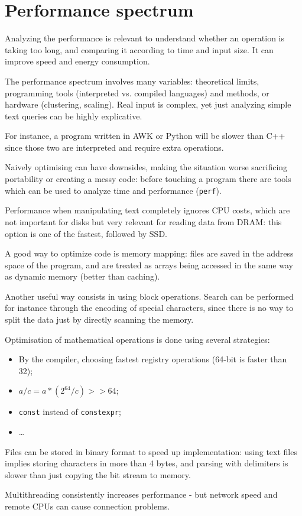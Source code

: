 \section{Performance spectrum}
Analyzing the performance is relevant to understand whether an operation is taking too long, and comparing it according to time and input size. It can improve speed and energy consumption.

The performance spectrum involves many variables: theoretical limits, programming tools (interpreted vs. compiled languages) and methods, or hardware (clustering, scaling). Real input is complex, yet just analyzing simple text queries can be highly explicative.

For instance, a program written in AWK or Python will be slower than C++ since those two are interpreted and require extra operations.

Naively optimising can have downsides, making the situation worse sacrificing portability or creating a messy code: before touching a program there are tools which can be used to analyze time and performance (\texttt{perf}).

Performance when manipulating text completely ignores CPU costs, which are not important for disks but very relevant for reading data from DRAM: this option is one of the fastest, followed by SSD.

A good way to optimize code is memory mapping: files are saved in the address space of the program, and are treated as arrays being accessed in the same way as dynamic memory (better than caching). 

Another useful way consists in using block operations. Search can be performed for instance through the encoding of special characters, since there is no way to split the data just by directly scanning the memory.

Optimisation of mathematical operations is done using several strategies:
\begin{itemize}
	\item By the compiler, choosing fastest registry operations (64-bit is faster than 32);
	\item $a / c = a * (2^{64} / c) >> 64$;
	\item \texttt{const} instead of \texttt{constexpr};
	\item \dots
\end{itemize}

Files can be stored in binary format to speed up implementation: using text files implies storing characters in more than 4 bytes, and parsing with delimiters is slower than just copying the bit stream to memory.

Multithreading consistently increases performance - but network speed and remote CPUs can cause connection problems. 

